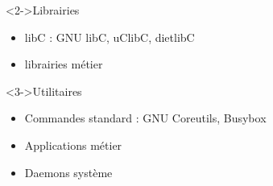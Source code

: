 	\begin{frame}
		\begin{block}<2->{Librairies}
			\begin{itemize}
				\item libC : GNU libC, uClibC, dietlibC
				\item librairies métier
			\end{itemize}
		\end{block}
		\begin{block}<3->{Utilitaires}
			\begin{itemize}
				\item Commandes standard : GNU Coreutils, Busybox
				\item Applications métier
				\item Daemons système
			\end{itemize}
		\end{block}
	\end{frame}


